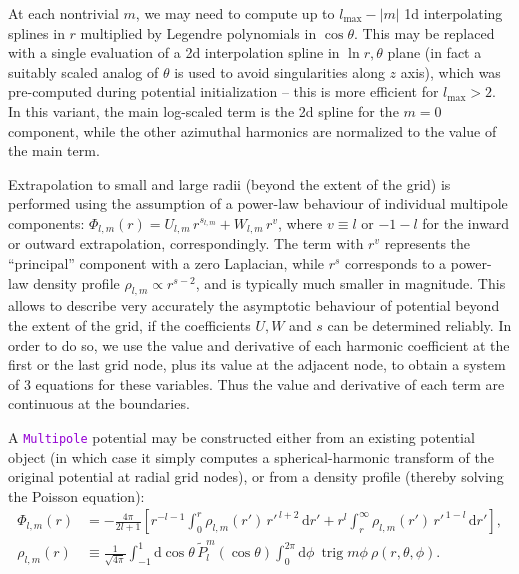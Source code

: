 \documentclass[12pt]{article}
\newcommand{\ttt}[1]{\textcolor{darkviolet}{\texttt{#1}}}
\renewcommand{\d}{\mathrm{d}}
\DeclareMathOperator{\trig}{trig}
\begin{document}
At each nontrivial $m$, we may need to compute up to $l_\mathrm{max}-|m|$ 1d interpolating splines in $r$ multiplied by Legendre polynomials in $\cos\theta$. This may be replaced with a single evaluation of a 2d interpolation spline in $\ln r,\theta$ plane (in fact a suitably scaled analog of $\theta$ is used to avoid singularities along $z$ axis), which was pre-computed during potential initialization -- this is more efficient for $l_\mathrm{max}>2$. In this variant, the main log-scaled term is the 2d spline for the $m=0$ component, while the other azimuthal harmonics are normalized to the value of the main term.

Extrapolation to small and large radii (beyond the extent of the grid) is performed using the assumption of a power-law behaviour of individual multipole components: $\Phi_{l,m}(r) = U_{l,m}\, r^{s_{l,m}} + W_{l,m}\, r^{v}$, where $v\equiv l$ or $-1-l$ for the inward or outward extrapolation, correspondingly. The term with $r^v$ represents the ``principal'' component with a zero Laplacian, while $r^s$ corresponds to a power-law density profile $\rho_{l,m}\propto r^{s-2}$, and is typically much smaller in magnitude. This allows to describe very accurately the asymptotic behaviour of potential beyond the extent of the grid, if the coefficients $U,W$ and $s$ can be determined reliably. In order to do so, we use the value and derivative of each harmonic coefficient at the first or the last grid node, plus its value at the adjacent node, to obtain a system of 3 equations for these variables. Thus the value and derivative of each term are continuous at the boundaries. 

A \ttt{Multipole} potential may be constructed either from an existing potential object (in which case it simply computes a spherical-harmonic transform of the original potential at radial grid nodes), or from a density profile (thereby solving the Poisson equation):
\begin{align}
\Phi_{l,m}(r) &= -\frac{4\pi}{2l+1} \left[ r^{-l-1} \int_0^r \rho_{l,m}(r')\,{r'}^{\,l+2}\,\d r' + r^l\int_r^\infty \rho_{l,m}(r')\,{r'}^{\,1-l}\,\d r' \right],  \label{eq:SphHarmPoisson} \\
\rho_{l,m}(r) &\equiv \frac{1}{\sqrt{4\pi}} \int_{-1}^1 \d \cos\theta\, \tilde P_l^m(\cos\theta) \int_0^{2\pi}\d \phi\:\trig m\phi\:\rho(r,\theta,\phi) .  \label{eq:SphHarmDensity}
\end{align}
\end{document}
